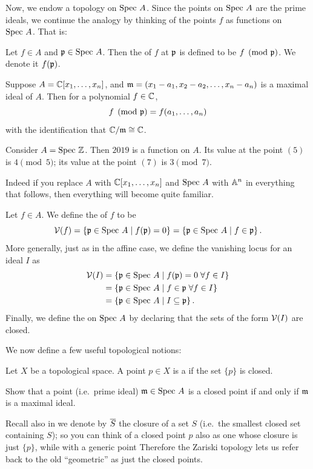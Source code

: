 Now, we endow a topology on $\text{Spec } A$.
Since the points on $\text{Spec } A$ are the prime ideals, we continue
the analogy by thinking of the points $f$ as functions on $\text{Spec } A$. That is:
\begin{definition}
	Let $f \in A$ and $\mathfrak p \in \text{Spec } A$.
	Then the  of $f$ at $\mathfrak p$ is defined to be $f \pmod{\mathfrak p}$.
	We denote it $f(\mathfrak p)$.
\end{definition}
\begin{example}
	Suppose $A = \mathbb C[x_1, \dots, x_n]$,
	and $\mathfrak m = (x_1-a_1, x_2-a_2, \dots, x_n-a_n)$ is a maximal ideal of $A$.
	Then for a polynomial $f \in \mathbb C$,
	\[ f \pmod {\mathfrak p} = f(a_1, \dots, a_n) \]
	with the identification that $\mathbb C/\mathfrak m \cong \mathbb C$.
\end{example}
\begin{example}
	Consider $A = \text{Spec } \mathbb Z$.
	Then $2019$ is a function on $A$.
	Its value at the point $(5)$ is $4 \pmod 5$;
	its value at the point $(7)$ is $3 \pmod 7$.
\end{example}

Indeed if you replace $A$ with $\mathbb C[x_1, \dots, x_n]$
and $\text{Spec } A$ with $\mathbb A^n$ in everything that follows,
then everything will become quite familiar.

\begin{definition}
	Let $f \in A$. We define the  of $f$ to be
	\[ \mathcal V(f) = \left\{ \mathfrak p \in \text{Spec } A \mid f(\mathfrak p) = 0 \right\}
		= \left\{ \mathfrak p \in \text{Spec } A \mid f \in \mathfrak p \right\}. \]
	More generally, just as in the affine case,
	we define the vanishing locus for an ideal $I$ as
	\begin{align*}
		\mathcal V(I) &= \left\{ \mathfrak p \in \text{Spec } A \mid f(\mathfrak p)=0 \; \forall f \in I \right\} \\
		&= \left\{ \mathfrak p \in \text{Spec } A \mid f \in \mathfrak p \; \forall f \in I \right\} \\
		&= \left\{ \mathfrak p \in \text{Spec } A \mid I \subseteq \mathfrak p \right\}.
	\end{align*}
	Finally, we define the  on $\text{Spec } A$
	by declaring that the sets of the form $\mathcal V(I)$ are closed.
\end{definition}

We now define a few useful topological notions:
\begin{definition}
	Let $X$ be a topological space.
	A point $p \in X$ is a 
	if the set $\{p\}$ is closed.
\end{definition}
\begin{ques}
	[Mandatory]
	Show that a point (i.e.\ prime ideal)
	$\mathfrak m \in \text{Spec } A$ is a closed point
	if and only if $\mathfrak m$ is a maximal ideal.
\end{ques}
Recall also in  we denote by $\overline S$
the closure of a set $S$ (i.e.\ the smallest closed set containing $S$);
so you can think of a closed point $p$ also
as one whose closure is just $\{p\}$,
while with a generic point
Therefore the Zariski topology lets us refer back to the old ``geometric''
as just the closed points.

